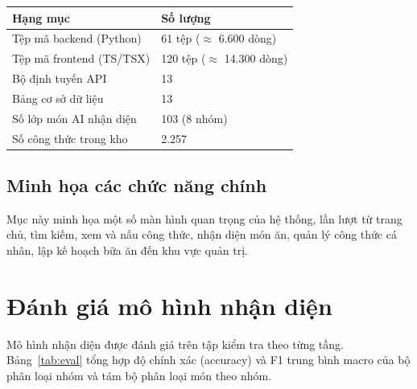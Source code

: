 \documentclass[../DoAn.tex]{subfiles}
\begin{document}
\begin{center}
\label{tab:thongke}
\begin{tabular}{|p{8cm}|p{4cm}|}\hline
\textbf{Hạng mục} & \textbf{Số lượng} \\ \hline
Tệp mã backend (Python) & 61 tệp ($\approx$ 6.600 dòng) \\ \hline
Tệp mã frontend (TS/TSX) & 120 tệp ($\approx$ 14.300 dòng) \\ \hline
Bộ định tuyến API & 13 \\ \hline
Bảng cơ sở dữ liệu & 13 \\ \hline
Số lớp món AI nhận diện & 103 (8 nhóm) \\ \hline
Số công thức trong kho & 2.257 \\ \hline
\end{tabular}
\end{center}

\subsection{Minh họa các chức năng chính}
\label{sec:4-minhhoa}
Mục này minh họa một số màn hình quan trọng của hệ thống, lần lượt từ trang chủ, tìm kiếm, xem và nấu công thức, nhận diện món ăn, quản lý công thức cá nhân, lập kế hoạch bữa ăn đến khu vực quản trị.


\section{Đánh giá mô hình nhận diện}
\label{sec:4-danhgia}
Mô hình nhận diện được đánh giá trên tập kiểm tra theo từng tầng. Bảng~\ref{tab:eval} tổng hợp độ chính xác (accuracy) và F1 trung bình macro của bộ phân loại nhóm và tám bộ phân loại món theo nhóm.
\end{document}
